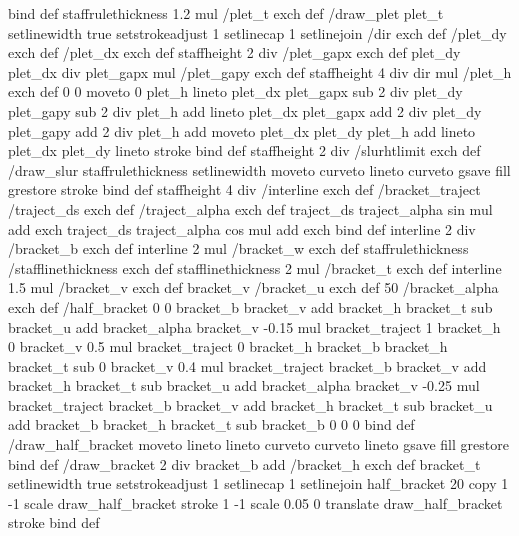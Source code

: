 {{{ } bind def
staffrulethickness 1.2 mul /plet_t exch def
/draw_plet
{
	plet_t setlinewidth
	true setstrokeadjust
	1 setlinecap
	1 setlinejoin
	/dir exch def
	/plet_dy exch def
	/plet_dx exch def
	staffheight 2 div /plet_gapx exch def
	plet_dy plet_dx div plet_gapx mul /plet_gapy exch def
	staffheight 4 div dir mul /plet_h exch def
%
	0 0 moveto
	0 plet_h lineto 
	plet_dx plet_gapx sub 2 div 
		plet_dy plet_gapy sub 2 div plet_h add lineto
	plet_dx plet_gapx add 2 div 
		plet_dy plet_gapy add 2 div plet_h add moveto
	plet_dx plet_dy plet_h add lineto
	plet_dx plet_dy lineto
	stroke
} bind def
staffheight 2 div /slurhtlimit exch def
/draw_slur
{
	staffrulethickness setlinewidth
	moveto
	curveto
	lineto
	curveto
	gsave
	fill
	grestore
	stroke
	} bind def
%
staffheight 4 div /interline exch def
%
/bracket_traject
{
  /traject_ds exch def
  /traject_alpha exch def
  traject_ds traject_alpha sin mul add
  exch
  traject_ds traject_alpha cos mul add
  exch
} bind def
%
interline 2 div /bracket_b exch def
interline 2 mul /bracket_w exch def
staffrulethickness /stafflinethickness exch def
stafflinethickness 2 mul /bracket_t exch def
interline 1.5 mul /bracket_v exch def
bracket_v /bracket_u exch def
50 /bracket_alpha exch def
%
/half_bracket
{
	0 0
	bracket_b bracket_v add bracket_h bracket_t sub bracket_u add
	bracket_alpha bracket_v -0.15 mul bracket_traject
	1 bracket_h
	0 bracket_v 0.5 mul bracket_traject
	0 bracket_h
	bracket_b bracket_h bracket_t sub
	0 bracket_v 0.4 mul bracket_traject
	bracket_b bracket_v add bracket_h bracket_t sub bracket_u add
	bracket_alpha bracket_v -0.25 mul bracket_traject
	bracket_b bracket_v add bracket_h bracket_t sub bracket_u add
	bracket_b bracket_h bracket_t sub
	bracket_b 0
	0 0
} bind def
%
/draw_half_bracket {
	moveto
	lineto
	lineto
	curveto
	curveto
	lineto
	gsave
	fill
	grestore
} bind def
%
/draw_bracket
{
	2 div bracket_b add /bracket_h exch def
	bracket_t setlinewidth
	true setstrokeadjust
	1 setlinecap
	1 setlinejoin
	half_bracket
	20 copy
	1 -1 scale
	draw_half_bracket
	stroke
	1 -1 scale
	0.05 0 translate
	draw_half_bracket
	stroke
} bind def
}}

\def\turnOnExperimentalFeatures{%
\special{ps:
}}

